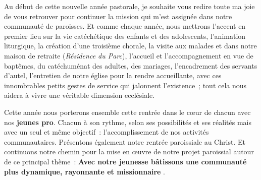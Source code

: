 

Au début de cette nouvelle année pastorale, je souhaite vous redire toute ma joie de vous retrouver pour continuer la mission qui m’est assignée dans notre communauté de paroisses. Et comme chaque année, nous mettrons l’accent en premier lieu sur la vie catéchétique des enfants et des adolescents,
l’animation liturgique, la création d’une troisième chorale, la visite aux malades et dans notre maison de retraite (\emph{Résidence du Parc}), l’accueil et l’accompagnement en vue de baptêmes,  du catéchuménat des adultes, des mariages, l’encadrement  des servants d’autel, l’entretien de notre église pour la rendre  accueillante, avec ces innombrables petits gestes de service qui jalonnent l’existence ; tout cela nous aidera à vivre une véritable dimension ecclésiale. 



Cette année nous porterons ensemble cette rentrée dans le cœur de chacun avec nos \textbf{jeunes pro}. Chacun à son rythme, selon ses possibilités et ses réalités mais avec un seul et même objectif : l’accomplissement de nos activités communautaires. Présentons également notre rentrée paroissiale au Christ. Et continuons notre chemin pour la mise en œuvre de notre projet paroissial autour de ce principal thème :
\textbf{\og Avec notre jeunesse bâtissons une communauté plus dynamique, rayonnante et missionnaire \fg{}}.

